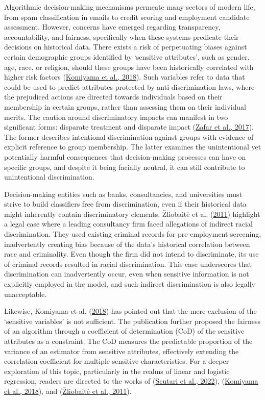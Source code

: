 \documentclass[
  11pt,
]{article}
\begin{document}
Algorithmic decision-making mechanisms permeate many sectors of modern
life, from spam classification in emails to credit scoring and
employment candidate assessment. However, concerns have emerged
regarding transparency, accountability, and fairness, specifically when
these systems predicate their decisions on historical data. There exists
a risk of perpetuating biases against certain demographic groups
identified by `sensitive attributes', such as gender, age, race, or
religion, should these groups have been historically correlated with
higher risk factors (\protect\hyperlink{ref-Komiyama2018}{Komiyama et
al., 2018}). Such variables refer to data that could be used to predict
attributes protected by anti-discrimination laws, where the prejudiced
actions are directed towards individuals based on their membership in
certain groups, rather than assessing them on their individual merits.
The caution around discriminatory impacts can manifest in two
significant forms: disparate treatment and disparate impact
(\protect\hyperlink{ref-Zafar2017}{Zafar et al., 2017}). The former
describes intentional discrimination against groups with evidence of
explicit reference to group membership. The latter examines the
unintentional yet potentially harmful consequences that decision-making
processes can have on specific groups, and despite it being facially
neutral, it can still contribute to unintentional discrimination.

Decision-making entities such as banks, consultancies, and universities
must strive to build classifiers free from discrimination, even if their
historical data might inherently contain discriminatory elements.
Žliobaitė et al. (\protect\hyperlink{ref-Zliobaite2011}{2011}) highlight
a legal case where a leading consultancy firm faced allegations of
indirect racial discrimination. They used existing criminal records for
pre-employment screening, inadvertently creating bias because of the
data's historical correlation between race and criminality. Even though
the firm did not intend to discriminate, its use of criminal records
resulted in racial discrimination. This case underscores that
discrimination can inadvertently occur, even when sensitive information
is not explicitly employed in the model, and such indirect
discrimination is also legally unacceptable.

Likewise, Komiyama et al. (\protect\hyperlink{ref-Komiyama2018}{2018})
has pointed out that the mere exclusion of the `sensitive variables' is
not sufficient. The publication further proposed the fairness of an
algorithm through a coefficient of determination (CoD) of the sensitive
attributes as a constraint. The CoD measures the predictable proportion
of the variance of an estimator from sensitive attributes, effectively
extending the correlation coefficient for multiple sensitive
characteristics. For a deeper exploration of this topic, particularly in
the realms of linear and logistic regression, readers are directed to
the works of (\protect\hyperlink{ref-Scutari2022}{Scutari et al.,
2022}), (\protect\hyperlink{ref-Komiyama2018}{Komiyama et al., 2018}),
and (\protect\hyperlink{ref-Zliobaite2011}{Žliobaitė et al., 2011}).
\end{document}
